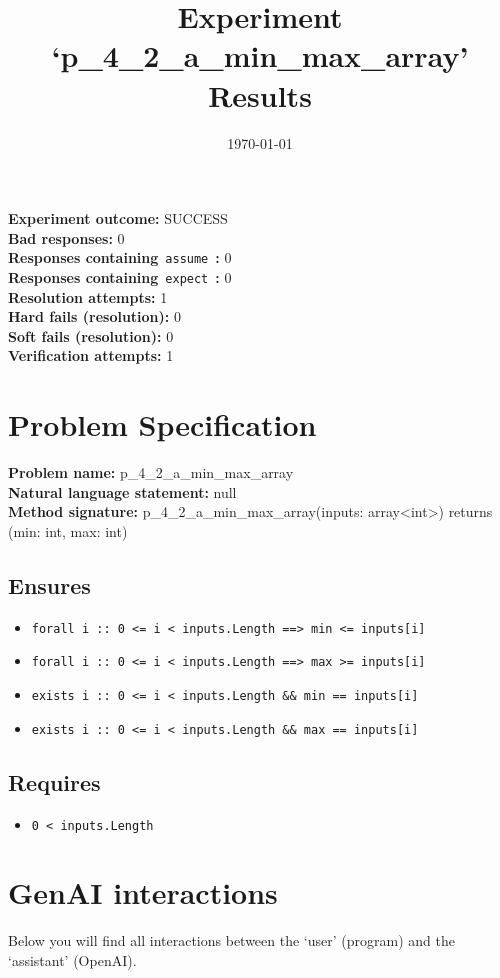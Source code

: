 \documentclass{article}
\begin{document}
\title{Experiment `p\_4\_2\_a\_min\_max\_array' Results}
\author{\today}
\date{}
\maketitle
\textbf{Experiment outcome: }SUCCESS
\\\textbf{Bad responses: }0
\\\textbf{Responses containing}~\texttt{assume}~\textbf{: }0
\\\textbf{Responses containing}~\texttt{expect}~\textbf{: }0
\\\textbf{Resolution attempts: }1
\\\textbf{Hard fails (resolution): }0
\\\textbf{Soft fails (resolution): }0
\\\textbf{Verification attempts: }1
\section*{Problem Specification}
\textbf{Problem name: }p\_4\_2\_a\_min\_max\_array
\\\textbf{Natural language statement: }null
\\\textbf{Method signature: }p\_4\_2\_a\_min\_max\_array(inputs: array<int>) returns (min: int, max: int)
\subsection*{Ensures}
\begin{itemize}
\item \texttt{forall i :: 0 <= i < inputs.Length ==> min <= inputs[i]}
\item \texttt{forall i :: 0 <= i < inputs.Length ==> max >= inputs[i]}
\item \texttt{exists i :: 0 <= i < inputs.Length \&\& min == inputs[i]}
\item \texttt{exists i :: 0 <= i < inputs.Length \&\& max == inputs[i]}
\end{itemize}
\subsection*{Requires}
\begin{itemize}
\item \texttt{0 < inputs.Length}
\end{itemize}
\clearpage
\section*{GenAI interactions}
Below you will find all interactions between the `user' (program) and the `assistant' (OpenAI).
\end{document}
